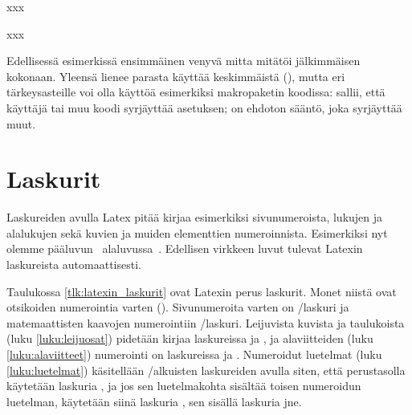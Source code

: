 \begin{koodilohkosis}
  x\hspace{0mm plus 1filll}x\hspace{0mm plus 1fill}x
\end{koodilohkosis}

\begin{tulossis}
  x\hspace{0mm plus 1filll}x\hspace{0mm plus 1fill}x
\end{tulossis}

Edellisessä esimerkissä ensimmäinen venyvä mitta  mitätöi
jälkimmäisen  kokonaan. Yleensä lienee parasta käyttää
keskimmäistä (), mutta eri tär\-keys\-as\-teil\-le voi olla
käyttöä esimerkiksi makropaketin koodissa:  sallii, että
käyttäjä tai muu koodi syrjäyttää asetuksen;  on ehdoton
sääntö, joka syrjäyttää muut.

\section{Laskurit}

Laskureiden avulla Latex pitää kirjaa esimerkiksi sivunumeroista,
lukujen ja alalukujen sekä kuvien ja muiden elementtien numeroinnista.
Esimerkiksi nyt olemme pääluvun~
alaluvussa~. Edellisen virkkeen luvut tulevat Latexin
laskureista automaattisesti.


Taulukossa \ref{tlk:latexin_laskurit} ovat Latexin perus laskurit. Monet
niistä ovat otsikoiden numerointia varten (). Sivunumeroita
varten on \-/laskuri ja matemaattisten kaavojen
numerointiin \-/laskuri. Leijuvista kuvista ja
taulukoista (luku \ref{luku:leijuosat}) pidetään kirjaa laskureissa
 ja , ja alaviitteiden (luku
\ref{luku:alaviitteet}) numerointi on laskureissa  ja
. Numeroidut luetelmat (luku \ref{luku:luetelmat})
käsitellään \-/alkuisten laskureiden avulla siten, että
perustasolla käytetään laskuria , ja jos sen luetelmakohta
sisältää toisen numeroidun luetelman, käytetään siinä laskuria
, sen sisällä laskuria  jne.

